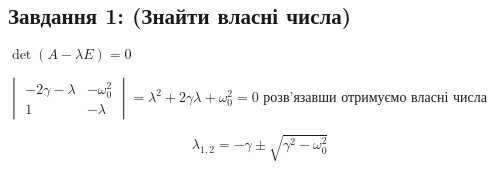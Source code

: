 \subsection{Завдання 1: (Знайти власні числа)}

$\det (A - \lambda E) = 0$

$\begin{vmatrix}
    -2\gamma  - \lambda & -\omega_0^2 \\
        1 & -\lambda
\end{vmatrix} = \lambda^2 + 2\gamma\lambda + \omega_0^2 = 0$  розв'язавши отримуємо власні числа


\begin{equation}\label{pr3:eigenval}
    \lambda_{1,2} = - \gamma \pm \sqrt{\gamma^2 - \omega^2_0}
\end{equation}

